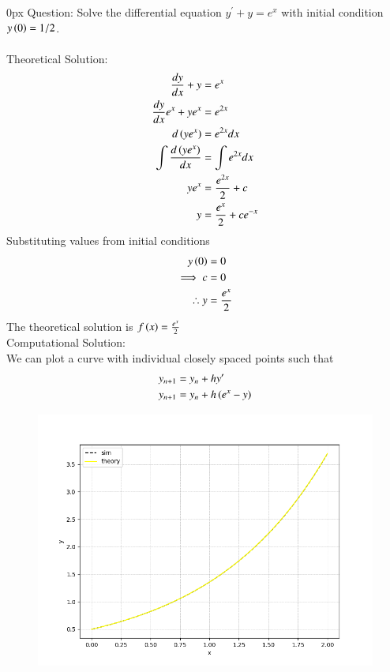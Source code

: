 \documentclass[journal,12pt,onecolumn]{IEEEtran}
\theoremstyle{remark}
\begin{document}
\title{}
\author{EE24BTECH11007 - Arnav Makarand Yadnopavit}
\maketitle
\renewcommand{\thefigure}{\theenumi}
\renewcommand{\thetable}{\theenumi}
\parindent 0px Question: Solve the differential equation $y^\prime+y=e^x$ with initial condition $y\left(0\right)=1/2$. \\
\solution\\
Theoretical Solution:\\
\begin{align}
    \frac{dy}{dx}+y&=e^x\\
    \frac{dy}{dx} e^x+ye^x&=e^{2x}\\
    d\left(ye^x\right)&=e^{2x}dx\\
    \int \frac{d\left(ye^x\right)}{dx}&=\int e^{2x}dx\\
    ye^x&=\frac{e^{2x}}{2}+c\\
    y&=\frac{e^x}{2}+ce^{-x}
\end{align}
Substituting values from initial conditions
\begin{align}
    y\left(0\right)&=0\\
    \implies c&=0\\
    \therefore y&=\frac{e^x}{2}
\end{align}
The theoretical solution is $f\left(x\right)=\frac{e^x}{2}$\\
Computational Solution:\\
We can plot a curve with individual closely spaced points such that
\begin{align}
    y_{n+1}&=y_n+hy^\prime\\
    y_{n+1}&=y_n+h\left(e^x-y\right)
\end{align}
\begin{figure}[h]
    \centering
    \includegraphics[width=\columnwidth]{figs/fig.png}
 \end{figure}
\end{document}
